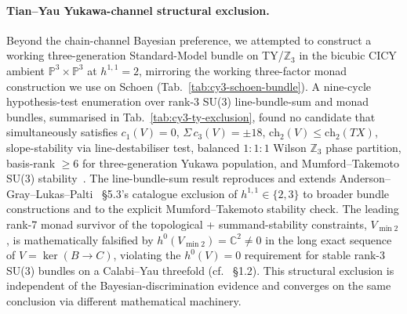 ﻿\documentclass[reprint,amsmath,amssymb,aps,prd,longbibliography,floatfix]{revtex4-2}
\begin{document}





\paragraph{Tian--Yau Yukawa-channel structural exclusion.}
Beyond the chain-channel Bayesian preference, we attempted to construct a working three-generation Standard-Model bundle on TY/$\mathbb{Z}_3$ in the bicubic CICY ambient $\mathbb{P}^3 \times \mathbb{P}^3$ at $h^{1,1} = 2$, mirroring the working three-factor monad construction we use on Schoen (Tab.~\ref{tab:cy3-schoen-bundle}). A nine-cycle hypothesis-test enumeration over rank-3 SU(3) line-bundle-sum and monad bundles, summarised in Tab.~\ref{tab:cy3-ty-exclusion}, found no candidate that simultaneously satisfies $c_1(V) = 0$, $\Sigma\,c_3(V) = \pm 18$, $\mathrm{ch}_2(V) \le \mathrm{ch}_2(TX)$, slope-stability via line-destabiliser test, balanced $1{:}1{:}1$ Wilson $\mathbb{Z}_3$ phase partition, basis-rank $\ge 6$ for three-generation Yukawa population, and Mumford--Takemoto SU(3) stability~\cite{HuybrechtsLehn2010}. The line-bundle-sum result reproduces and extends Anderson--Gray--Lukas--Palti~\cite{AndersonGrayLukasPalti2012} §5.3's catalogue exclusion of $h^{1,1} \in \{2,3\}$ to broader bundle constructions and to the explicit Mumford--Takemoto stability check. The leading rank-7 monad survivor of the topological + summand-stability constraints, $V_{\min 2}$, is mathematically falsified by $h^0(V_{\min 2}) = \mathbb{C}^2 \neq 0$ in the long exact sequence of $V = \ker(B \to C)$, violating the $h^0(V) = 0$ requirement for stable rank-3 SU(3) bundles on a Calabi--Yau threefold (cf.~\cite{HuybrechtsLehn2010} §1.2). This structural exclusion is independent of the Bayesian-discrimination evidence and converges on the same conclusion via different mathematical machinery.




\end{document}
